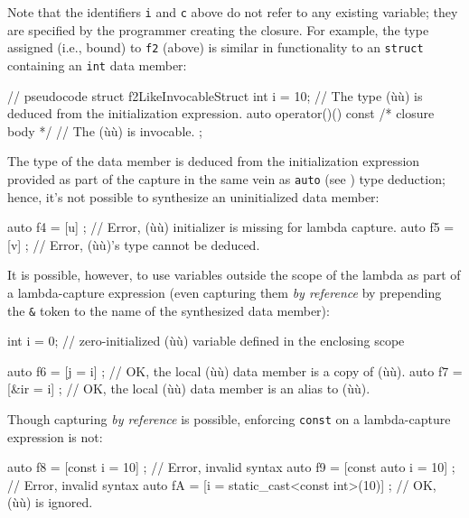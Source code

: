 \noindent Note that the identifiers \lstinline!i! and \lstinline!c! above do not refer
to any existing variable; they are specified by the programmer creating
the closure. For example, the  type assigned (i.e.,
bound) to \lstinline!f2! (above) is similar in functionality to an
 \lstinline!struct! containing an \lstinline!int! data
member:

\begin{emcppslisting}[emcppsstandards={c++14}]
// pseudocode
struct f2LikeInvocableStruct
{
    int i = 10;  // The type (ù{}ù) is deduced from the initialization expression.
    auto operator()() const { /* closure body */ }  // The (ù{}ù) is invocable.
};
\end{emcppslisting}
    
\noindent The type of the data member is deduced from the initialization
expression provided as part of the capture in the same vein as
\lstinline!auto! (see ) type deduction; hence, it's not possible to
synthesize an uninitialized  data member:

\begin{emcppslisting}
auto f4 = [u]{ };    // Error, (ù{}ù) initializer is missing for lambda capture.
auto f5 = [v{}]{ };  // Error, (ù{}ù)'s type cannot be deduced.
\end{emcppslisting}
    
\noindent It is possible, however, to use variables outside the scope of the
lambda as part of a lambda-capture expression (even capturing them \emph{by
reference} by prepending the \lstinline!&! token to the name of the
synthesized data member):

\begin{emcppslisting}[emcppsstandards={c++14}]
int i = 0;  // zero-initialized (ù{}ù) variable defined in the enclosing scope

auto f6 = [j   = i]{ };  // OK, the local (ù{}ù) data member is a copy of (ù{}ù).
auto f7 = [&ir = i]{ };  // OK, the local (ù{}ù) data member is an alias to (ù{}ù).
\end{emcppslisting}
    
\noindent Though capturing \emph{by reference} is possible, enforcing \lstinline!const! on a lambda-capture expression is not:

\begin{emcppslisting}[emcppsstandards={c++14}]
auto f8 = [const i = 10]{ };                    // Error, invalid syntax
auto f9 = [const auto i = 10]{ };               // Error, invalid syntax
auto fA = [i = static_cast<const int>(10)]{ };  // OK, (ù{}ù) is ignored.
\end{emcppslisting}
    
